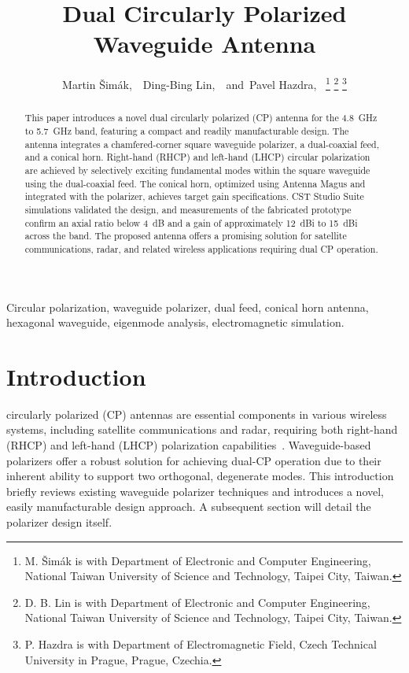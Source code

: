 \documentclass[journal]{IEEEtran}
\title{Dual Circularly Polarized Waveguide Antenna}
\author{Martin Šimák,~\IEEEmembership{Student Member,~IEEE,}~Ding-Bing Lin,~\IEEEmembership{Member,~IEEE,}~and~Pavel Hazdra,~\IEEEmembership{Member,~IEEE}%
\thanks{M. Šimák is with Department of Electronic and Computer Engineering, National Taiwan University of Science and Technology, Taipei City, Taiwan.}%
\thanks{D. B. Lin is with Department of Electronic and Computer Engineering, National Taiwan University of Science and Technology, Taipei City, Taiwan.}%
\thanks{P. Hazdra is with Department of Electromagnetic Field, Czech Technical University in Prague, Prague, Czechia.}%
}
\begin{document}
\maketitle

\begin{abstract}
    This paper introduces a novel dual circularly polarized (CP) antenna for the 4.8~GHz to 5.7~GHz band, featuring a compact and readily manufacturable design. The antenna integrates a chamfered-corner square waveguide polarizer, a dual-coaxial feed, and a conical horn. Right-hand (RHCP) and left-hand (LHCP) circular polarization are achieved by selectively exciting fundamental modes within the square waveguide using the dual-coaxial feed. The conical horn, optimized using Antenna Magus and integrated with the polarizer, achieves target gain specifications. CST Studio Suite simulations validated the design, and measurements of the fabricated prototype confirm an axial ratio below 4~dB and a gain of approximately 12~dBi to 15~dBi across the band. The proposed antenna offers a promising solution for satellite communications, radar, and related wireless applications requiring dual CP operation.
\end{abstract}

\begin{IEEEkeywords}
Circular polarization, waveguide polarizer, dual feed, conical horn antenna, hexagonal waveguide, eigenmode analysis, electromagnetic simulation.
\end{IEEEkeywords}

\section{Introduction}

 circularly polarized (CP) antennas are essential components in various wireless systems, including satellite communications and radar, requiring both right-hand (RHCP) and left-hand (LHCP) polarization capabilities~\cite{cite1, cite2}. Waveguide-based polarizers offer a robust solution for achieving dual-CP operation due to their inherent ability to support two orthogonal, degenerate modes. This introduction briefly reviews existing waveguide polarizer techniques and introduces a novel, easily manufacturable design approach. A subsequent section will detail the polarizer design itself.
\end{document}
